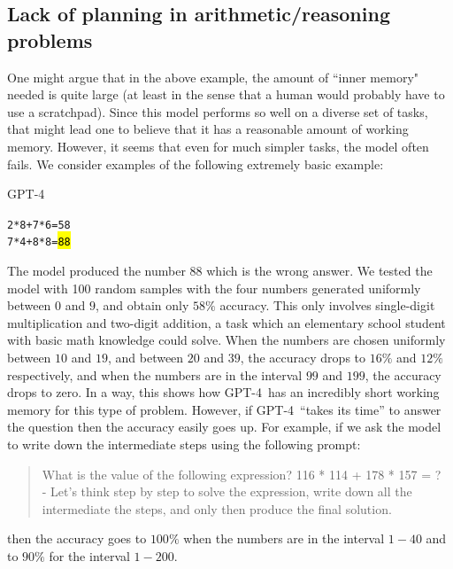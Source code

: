 \subsection{Lack of planning in arithmetic/reasoning problems} One might argue that in the above example, the amount of ``inner memory" needed is quite large (at least in the sense that a human would probably have to use a scratchpad). Since this model performs so well on a diverse set of tasks, that might lead one to believe that it has a reasonable amount of working memory. However, it seems that even for much simpler tasks, the model often fails. We consider examples of the following extremely basic example:

\begin{AIbox}{GPT-4}
\scriptsize
\parbox{1\textwidth}{
\begin{alltt}

2 * 8 + 7 * 6 = 58 \\

7 * 4 + 8 * 8 = \hl{88}

\end{alltt}
}
\end{AIbox}

The model produced the number $88$ which is the wrong answer. We tested the model with 100 random samples with the four numbers generated uniformly between $0$ and $9$, and obtain only $58\%$ accuracy. This only involves single-digit multiplication and two-digit addition, a task which an elementary school student with basic math knowledge could solve. When the numbers are chosen uniformly between $10$ and $19$, and between $20$ and $39$, the accuracy drops to $16\%$ and $12\%$ respectively, and when the numbers are in the interval $99$ and $199$, the accuracy drops to zero. In a way, this shows how GPT-4\ has an incredibly short working memory for this type of problem. However, if GPT-4\ ``takes its time'' to answer the question then the accuracy easily goes up. For example, if we ask the model to write down the intermediate steps using the following prompt:

\begin{quote}
What is the value of the following expression? 116 * 114 + 178 * 157 = ? \\
- Let's think step by step to solve the expression, write down all the intermediate the steps, and only then produce the final solution.
\end{quote}

then the accuracy goes to $100\%$ when the numbers are in the interval $1-40$ and to $90\%$ for the interval $1-200$.

